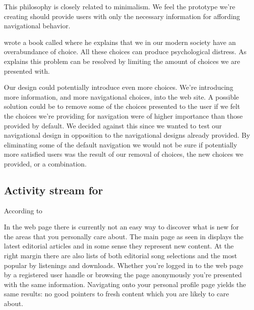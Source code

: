 This philosophy is closely related to minimalism.%
We feel the prototype we're creating should provide users
with only the necessary information for affording navigational behavior.

\citet{schwartz04} wrote a book called
 where he explains that
we in our modern society have an overabundance of choice. All these choices
can produce psychological distress. As \citeauthor{schwartz04} explains this
problem can be resolved by limiting the amount of choices we are presented
with.

Our design could potentially introduce even more choices. We're
introducing more information, and more navigational choices, into the
\urort{} web site. A possible solution could be to remove some of the
choices presented to the user if we felt the choices we're providing
for navigation were of higher importance than those provided by
default. We decided against this since we wanted to test our navigational
design in opposition to the navigational designs already provided. By
eliminating some of the default navigation we would not be sure
if potentially more satisfied users was the result of our removal of
choices, the new choices we provided, or a combination.

\subsection{Activity stream for \urort{}}
\label{section:implementation.design.activity.stream}

According to 

In the \urort{} web page there is currently not an easy way to discover what
is new for the areas that you personally care about. The main page
as seen in 
displays the latest editorial articles and in some sense they represent
new content. At the right margin there are also lists of both editorial song
selections and the most popular by listenings and downloads. Whether you're
logged in to the web page by a registered user handle or browsing the page
anonymously you're presented with the same information. Navigating onto your
personal profile page yields the same results: no good pointers to fresh
content which you are likely to care about.

